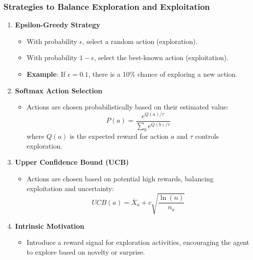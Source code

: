 \documentclass[aspectratio=169]{beamer}
\begin{document}
\begin{frame}[fragile]
    \frametitle{Strategies to Balance Exploration and Exploitation}
    \begin{enumerate}
        \item \textbf{Epsilon-Greedy Strategy}
            \begin{itemize}
                \item With probability \( \epsilon \), select a random action (exploration).
                \item With probability \( 1 - \epsilon \), select the best-known action (exploitation).
                \item \textbf{Example}: If \( \epsilon = 0.1\), there is a 10\% chance of exploring a new action.
            \end{itemize}
        
        \item \textbf{Softmax Action Selection}
            \begin{itemize}
                \item Actions are chosen probabilistically based on their estimated value:
                \begin{equation}
                    P(a) = \frac{e^{Q(a)/\tau}}{\sum_{b} e^{Q(b)/\tau}}
                \end{equation}
                where \( Q(a) \) is the expected reward for action \( a \) and \( \tau \) controls exploration.
            \end{itemize}
        
        \item \textbf{Upper Confidence Bound (UCB)}
            \begin{itemize}
                \item Actions are chosen based on potential high rewards, balancing exploitation and uncertainty:
                \begin{equation}
                    UCB(a) = \overline{X}_a + c \sqrt{\frac{\ln(n)}{n_a}}
                \end{equation}
            \end{itemize}
        
        \item \textbf{Intrinsic Motivation}
            \begin{itemize}
                \item Introduce a reward signal for exploration activities, encouraging the agent to explore based on novelty or surprise.
            \end{itemize}
    \end{enumerate}
\end{frame}
\end{document}
